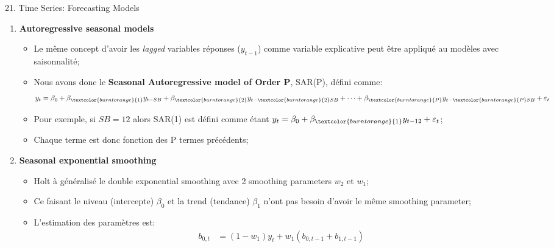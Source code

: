 \documentclass[12pt, titlepage, french]{report}
\begin{document}
\begin{CHPT_SUMM}[label = {timeseries21}]{21. Time Series: Forecasting Models}
\begin{enumerate}
\begin{itemize}
\begin{align*}
		\end{align*}
		Pour exemple, si le série était des observations mensuelles alors $SB = 12$;
		\item	Par la suite, on défini le modèle de régression linéaire multiple avec $p = 2m$, et $m \le SB/2$, variables explicatives: 
		\begin{align*}
			y_{t}
				&=	\beta_{0} + S_t + \varepsilon_{t}	\\
				&=	\beta_{0} + \sum_{i = 1}^{m} \{ \beta_{1i} \sin(f_{i}t) + \beta_{2i} \cos(f_{i}t)	 \} + \varepsilon_{t} 
		\end{align*}
		\end{itemize}
	\item[]	\textbf{Autoregressive seasonal models}
		\begin{itemize}
		\item	Le même concept d'avoir les \textit{lagged} variables réponses ($y_{t - 1}$) comme variable explicative peut être appliqué au modèles avec saisonnalité;
		\item	Nous avons donc le \textbf{Seasonal Autoregressive model of \textcolor{burntorange}{Order P}}, SAR(\textcolor{burntorange}{P}), défini comme:
		\begin{align*}
			y_{t}
				&=	\beta_{0} + \beta_{\textcolor{burntorange}{1}}y_{t - SB} + \beta_{\textcolor{burntorange}{2}} y_{t - \textcolor{burntorange}{2}SB} + \dots + \beta_{\textcolor{burntorange}{P}} y_{t - \textcolor{burntorange}{P} SB} + \varepsilon_{t}
		\end{align*}
		\item[]	Pour exemple, si $SB = 12$ alors SAR(\textcolor{burntorange}{1}) est défini comme étant $y_{t} = \beta_{0} + \beta_{\textcolor{burntorange}{1}}y_{t - 12} + \varepsilon_{t}$;
		\item	Chaque terme est donc fonction des P termes précédents;
		\end{itemize}
	\item[]	\textbf{Seasonal exponential smoothing}
		\begin{itemize}
		\item	Holt à généralisé le double exponential smoothing avec 2 smoothing parameters $w_{2}$ et $w_{1}$;
		\item[]	Ce faisant le niveau (intercepte) $\beta_{0}$ et la trend (tendance) $\beta_{1}$ n'ont pas besoin d'avoir le même smoothing parameter;
		\item	L'estimation des paramètres est:
			\begin{align*}
			b_{0, t}	
			&=	(1 - w_{1}) y_{t} + w_{1} (b_{0, t - 1} + b_{1, t - 1})	\\

\end{align*}
\end{itemize}
\end{enumerate}
\end{CHPT_SUMM}
\end{document}
